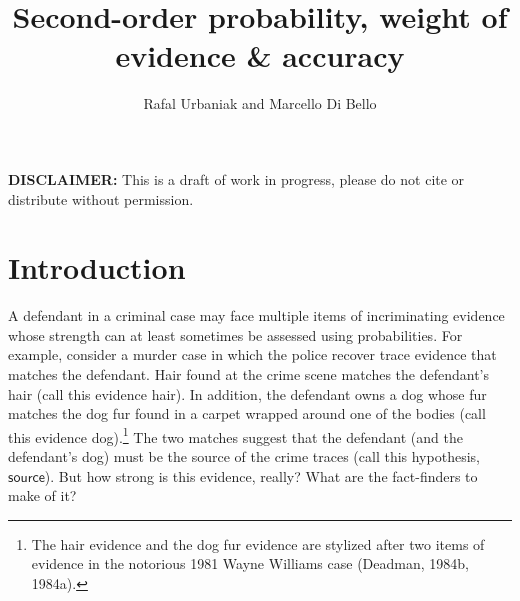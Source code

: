 \documentclass[
  10pt,
  dvipsnames,enabledeprecatedfontcommands]{scrartcl}
\title{Second-order probability, weight of evidence \& accuracy}
\author{Rafal Urbaniak and Marcello Di Bello}
\date{}
\begin{document}
\maketitle

{
\hypersetup{linkcolor=}
\setcounter{tocdepth}{2}
\tableofcontents
}
\vspace{2cm}

\noindent \textbf{DISCLAIMER:} This is a draft of work in progress,
please do not cite or distribute without permission.

\thispagestyle{empty}

\newpage

\hypertarget{introduction}{%
\section{Introduction}\label{introduction}}

A defendant in a criminal case may face multiple items of incriminating
evidence whose strength can at least sometimes be assessed using
probabilities. For example, consider a murder case in which the police
recover trace evidence that matches the defendant. Hair found at the
crime scene matches the defendant's hair (call this evidence
\textsf{hair}). In addition, the defendant owns a dog whose fur matches
the dog fur found in a carpet wrapped around one of the bodies (call
this evidence \textsf{dog}).\footnote{The hair evidence and the dog fur
  evidence are stylized after two items of evidence in the notorious
  1981 Wayne Williams case (Deadman, 1984b, 1984a).} The two matches
suggest that the defendant (and the defendant's dog) must be the source
of the crime traces (call this hypothesis, \(\mathsf{source}\)). But how
strong is this evidence, really? What are the fact-finders to make of
it?
\end{document}
